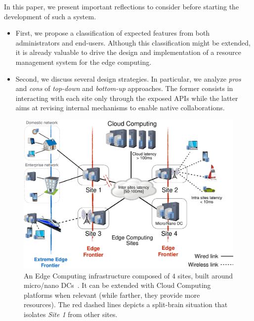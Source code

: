 In this paper, we
present important reflections to consider before starting the development of such a system.
\begin{itemize}
\item First, we propose a classification of expected features from
  both administrators and end-users. Although this classification might be extended, it is already valuable to drive the design and implementation of a resource management system for the edge computing.
    \item Second, we discuss several design strategies. In particular, we
  analyze \emph{pros} and \emph{cons} of \emph{top-down} and \emph{bottom-up} approaches. The
  former consists in interacting with each site only through the exposed APIs
  while the latter aims at revising internal mechanisms to enable
  native collaborations.
  \end{itemize}

\begin{figure}[t]
  \centering
  \includegraphics[width=\columnwidth]{./figures/figure_fog.pdf}
  \caption{An Edge Computing infrastructure composed of $4$ sites, built around
    micro/nano DCs~\cite{7923796}. It can be extended with Cloud Computing
    platforms when relevant (while farther, they provide more resources).
    The red dashed lines depicts a split-brain situation that isolates
    \emph{Site 1} from other sites.}
  \label{fig:fogedge-archi}
\end{figure}

